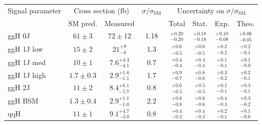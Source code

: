 \begin{tabular}{ l | c | c | c | c | c | c | c }
\multirow{2}{*}{Signal parameter} & \multicolumn{2}{c}{Cross section (fb)}  & \multirow{2}{*}{$\sigma/\sigma_{\text{SM}}$}    & \multicolumn{4}{c}{Uncertainty on $\sigma/\sigma_{\text{SM}}$} \\
  & \multicolumn{1}{c}{SM pred.}  & \multicolumn{1}{c}{Measured} &          & \multicolumn{1}{c}{Total} & \multicolumn{1}{c}{Stat.} & \multicolumn{1}{c}{Exp.} & Theo.               \\
\hline
ggH 0J       & $61 \pm 3$                    & $72 \pm 12$                  & 1.18  & $_{-0.20}^{+0.20}$ & $_{-0.18}^{+0.18}$ & $_{-0.08}^{+0.10}$ & $_{-0.05}^{+0.06}$  \\[3pt]
ggH 1J low   & $15 \pm 2$                    & $21^{+9}_{-8}$               & 1.3   & $_{-0.5}^{+0.6}$   & $_{-0.5}^{+0.6}$   & $_{-0.2}^{+0.2}$   & $_{-0.1}^{+0.2}$    \\[3pt]
ggH 1J med   & $10 \pm 1$                    & $7.6^{+4.3}_{-4.1}$          & 0.7   & $_{-0.4}^{+0.4}$   & $_{-0.4}^{+0.4}$   & $_{-0.1}^{+0.1}$   & $_{-0.0}^{+0.1}$    \\[3pt]
ggH 1J high  & $1.7 \pm 0.3$                 & $2.9^{+1.6}_{-1.1}$          & 1.7   & $_{-0.7}^{+0.9}$   & $_{-0.6}^{+0.8}$   & $_{-0.2}^{+0.3}$   & $_{-0.1}^{+0.2}$    \\[3pt]
ggH 2J       & $11 \pm 2$                    & $8.4^{+6.1}_{-5.7}$          & 0.8   & $_{-0.5}^{+0.6}$   & $_{-0.5}^{+0.5}$   & $_{-0.1}^{+0.1}$   & $_{-0.1}^{+0.3}$    \\[3pt]
ggH BSM      & $1.3 \pm 0.4$                 & $2.9^{+1.1}_{-1.0}$          & 2.2   & $_{-0.8}^{+0.8}$   & $_{-0.6}^{+0.6}$   & $_{-0.3}^{+0.4}$   & $_{-0.2}^{+0.3}$    \\[3pt]
qqH          & $11 \pm 1$                    & $9.1^{+4.7}_{-3.0}$          & 0.8   & $_{-0.3}^{+0.4}$   & $_{-0.3}^{+0.4}$   & $_{-0.1}^{+0.2}$   & $_{-0.0}^{+0.1}$    \\[3pt]
\end{tabular}
